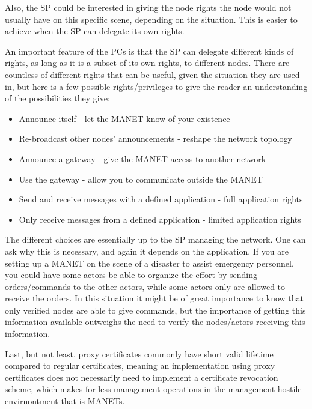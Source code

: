 Also, the \ac{SP} could be interested in giving the node rights the node would
not usually have on this specific scene, depending on the situation. This is
easier to achieve when the \ac{SP} can delegate its own rights.

An important feature of the \acp{PC} is that the \ac{SP} can delegate different
kinds of rights, as long as it is a subset of its own rights, to different
nodes. There are countless of different rights that can be useful, given the situation
they are used in, but here is a few possible rights/privileges to give the
reader an understanding of the possibilities they give:

\begin{itemize}
  \item Announce itself - let the \ac{MANET} know of your existence
  \item Re-broadcast other nodes' announcements - reshape the network topology
  \item Announce a gateway - give the \ac{MANET} access to another network
  \item Use the gateway - allow you to communicate outside the \ac{MANET}
  \item Send and receive messages with a defined application - full application
  rights
  \item Only receive messages from a defined application - limited application
  rights
\end{itemize}

The different choices are essentially up to the \ac{SP} managing the network.
One can ask why this is necessary, and again it depends on the application. If
you are setting up a \ac{MANET} on the scene of a disaster to assist emergency
personnel, you could have some actors be able to organize the effort by sending
orders/commands to the other actors, while some actors only are allowed to
receive the orders. In this situation it might be of great importance to know
that only verified nodes are able to give commands, but the importance of
getting this information available outweighs the need to verify the nodes/actors
receiving this information.

Last, but not least, proxy certificates commonly have short valid lifetime
compared to regular certificates, meaning an implementation using proxy
certificates does not necessarily need to implement a certificate revocation
scheme, which makes for less management operations in the management-hostile
envirnontment that is \acp{MANET}.


